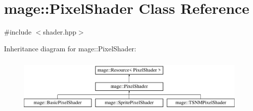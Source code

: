 \hypertarget{classmage_1_1_pixel_shader}{}\section{mage\+:\+:Pixel\+Shader Class Reference}
\label{classmage_1_1_pixel_shader}


{\ttfamily \#include $<$shader.\+hpp$>$}

Inheritance diagram for mage\+:\+:Pixel\+Shader\+:\begin{figure}[H]
\begin{center}
\leavevmode
\includegraphics[height=2.772277cm]{classmage_1_1_pixel_shader}
\end{center}
\end{figure}

